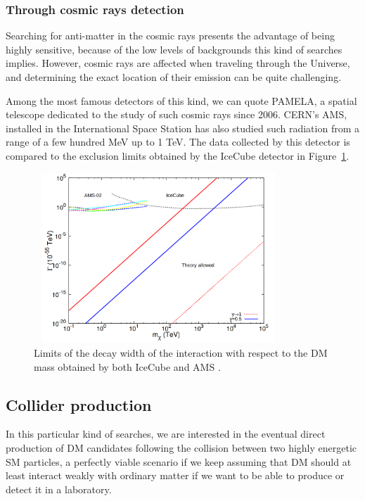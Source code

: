 \documentclass[a4paper, 10pt, openright]{report}
\begin{document}
\subsubsection*{Through cosmic rays detection}

Searching for anti-matter in the cosmic rays presents the advantage of being highly sensitive, because of the low levels of backgrounds this kind of searches implies. However, cosmic rays are affected when traveling through the Universe, and determining the exact location of their emission can be quite challenging.

Among the most famous detectors of this kind, we can quote PAMELA, a spatial telescope dedicated to the study of such cosmic rays since 2006. \ac{CERN}'s \ac{AMS}, installed in the International Space Station has also studied such radiation from a range of a few hundred MeV up to 1 TeV. The data collected by this detector is compared to the exclusion limits obtained by the IceCube detector in Figure~\ref{fig:AMSData}.

\begin{figure}[htbp]
\begin{center}
\includegraphics[width=9.4cm, height=6.4cm]{figs/AMSData.png}
\caption{Limits of the decay width of the interaction with respect to the \ac{DM} mass obtained by both IceCube and \ac{AMS} \cite{AMSData}.}
\label{fig:AMSData}
\end{center}
\end{figure}

\subsection{Collider production} \label{subsection:ColliderProduction}

In this particular kind of searches, we are interested in the eventual direct production of \ac{DM} candidates following the collision between two highly energetic \ac{SM} particles, a perfectly viable scenario if we keep assuming that \ac{DM} should at least interact weakly with ordinary matter if we want to be able to produce or detect it in a laboratory.
\end{document}
